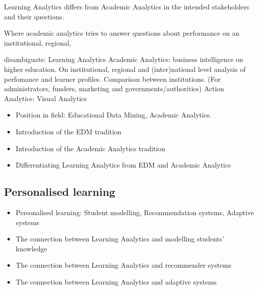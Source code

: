 \documentclass[11pt]{article}
\begin{document}

\newpage
Learning Analytics differs from Academic Analytics in the intended stakeholders and their questions. 

Where academic analytics tries to answer questions about performance on an institutional, regional, 

disambiguate:
Learning Analytics
Academic Analytics: business intelligence on higher education. On institutional, regional and (inter)national level analysis of perfomance and learner profiles. Comparison between institutions. (For administrators, funders, marketing and governments/authorities)
Action Analytics: 
Visual Analytics





\cite{Ferguson2012a} \cite{Greller2012}
\begin{itemize}
\item Position in field: Educational Data Mining, Academic Analytics.
\item Introduction of the EDM tradition
\item Introduction of the Academic Analytics tradition
\item Differentiating Learning Analytics from EDM and Academic Analytics
\end{itemize}
\subsection{Personalised learning}
\begin{itemize}
\item Personalised learning: Student modelling, Recommendation systems, Adaptive systems
\item The connection between Learning Analytics and modelling students’ knowledge
\item The connection between Learning Analytics and recommender systems
\item The connection between Learning Analytics and adaptive systems
\end{itemize}
\end{document}
